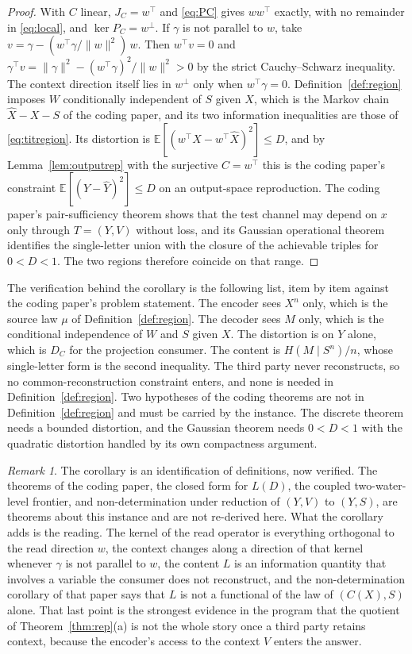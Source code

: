 \documentclass[11pt]{article}
\theoremstyle{definition}
\theoremstyle{remark}
\newtheorem*{remark}{Remark}
\newcommand{\PC}{P_{C}}
\newcommand{\E}{\mathbb{E}}
\begin{document}
\begin{proof}
With $C$ linear, $J_{C}=w^{\top}$ and \eqref{eq:PC} gives $ww^{\top}$ exactly, with no remainder in \eqref{eq:local}, and $\ker\PC=w^{\perp}$.
If $\gamma$ is not parallel to $w$, take $v=\gamma-(w^{\top}\gamma/\|w\|^{2})\,w$. Then $w^{\top}v=0$ and $\gamma^{\top}v=\|\gamma\|^{2}-(w^{\top}\gamma)^{2}/\|w\|^{2}>0$ by the strict Cauchy--Schwarz inequality. The context direction itself lies in $w^{\perp}$ only when $w^{\top}\gamma=0$.
Definition~\ref{def:region} imposes $W$ conditionally independent of $S$ given $X$, which is the Markov chain $\hat{X}-X-S$ of the coding paper, and its two information inequalities are those of \eqref{eq:titregion}.
Its distortion is $\E[(w^{\top}X-w^{\top}\hat{X})^{2}]\le D$, and by Lemma~\ref{lem:outputrep} with the surjective $C=w^{\top}$ this is the coding paper's constraint $\E[(Y-\hat{Y})^{2}]\le D$ on an output-space reproduction.
The coding paper's pair-sufficiency theorem shows that the test channel may depend on $x$ only through $T=(Y,V)$ without loss, and its Gaussian operational theorem identifies the single-letter union with the closure of the achievable triples for $0<D<1$.
The two regions therefore coincide on that range.
\end{proof}

The verification behind the corollary is the following list, item by item against the coding paper's problem statement.
The encoder sees $X^{n}$ only, which is the source law $\mu$ of Definition~\ref{def:region}.
The decoder sees $M$ only, which is the conditional independence of $W$ and $S$ given $X$.
The distortion is on $Y$ alone, which is $D_{C}$ for the projection consumer.
The content is $H(M\mid S^{n})/n$, whose single-letter form is the second inequality.
The third party never reconstructs, so no common-reconstruction constraint enters, and none is needed in Definition~\ref{def:region}.
Two hypotheses of the coding theorems are not in Definition~\ref{def:region} and must be carried by the instance. The discrete theorem needs a bounded distortion, and the Gaussian theorem needs $0<D<1$ with the quadratic distortion handled by its own compactness argument.

\begin{remark}
The corollary is an identification of definitions, now verified.
The theorems of the coding paper, the closed form for $L(D)$, the coupled two-water-level frontier, and non-determination under reduction of $(Y,V)$ to $(Y,S)$, are theorems about this instance and are not re-derived here.
What the corollary adds is the reading.
The kernel of the read operator is everything orthogonal to the read direction $w$, the context changes along a direction of that kernel whenever $\gamma$ is not parallel to $w$, the content $L$ is an information quantity that involves a variable the consumer does not reconstruct, and the non-determination corollary of that paper says that $L$ is not a functional of the law of $(C(X),S)$ alone.
That last point is the strongest evidence in the program that the quotient of Theorem~\ref{thm:rep}(a) is not the whole story once a third party retains context, because the encoder's access to the context $V$ enters the answer.
\end{remark}
\end{document}
